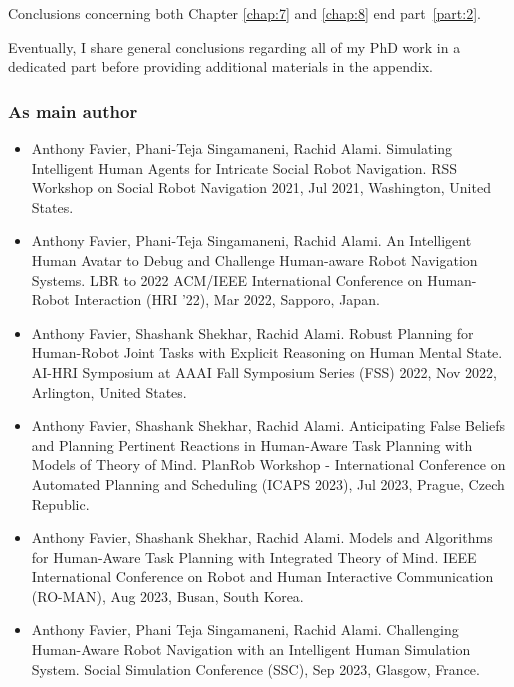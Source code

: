 Conclusions concerning both Chapter \ref{chap:7} and \ref{chap:8} end part~\ref{part:2}.

Eventually, I share general conclusions regarding all of my PhD work in a dedicated part before providing additional materials in the appendix.  


\subsubsection*{As main author}
\begin{itemize}

    \item Anthony Favier, Phani-Teja Singamaneni, Rachid Alami. Simulating Intelligent Human Agents for Intricate Social Robot Navigation. RSS Workshop on Social Robot Navigation 2021, Jul 2021, Washington, United States. 
    \item Anthony Favier, Phani-Teja Singamaneni, Rachid Alami. An Intelligent Human Avatar to Debug and Challenge Human-aware Robot Navigation Systems. LBR to 2022 ACM/IEEE International Conference on Human-Robot Interaction (HRI '22), Mar 2022, Sapporo, Japan. 
    \item Anthony Favier, Shashank Shekhar, Rachid Alami. Robust Planning for Human-Robot Joint Tasks with Explicit Reasoning on Human Mental State. AI-HRI Symposium at AAAI Fall Symposium Series (FSS) 2022, Nov 2022, Arlington, United States. 
    \item Anthony Favier, Shashank Shekhar, Rachid Alami. Anticipating False Beliefs and Planning Pertinent Reactions in Human-Aware Task Planning with Models of Theory of Mind. PlanRob Workshop - International Conference on Automated Planning and Scheduling (ICAPS 2023), Jul 2023, Prague, Czech Republic. 
    \item Anthony Favier, Shashank Shekhar, Rachid Alami. Models and Algorithms for Human-Aware Task Planning with Integrated Theory of Mind. IEEE International Conference on Robot and Human Interactive Communication (RO-MAN), Aug 2023, Busan, South Korea. 
    \item Anthony Favier, Phani Teja Singamaneni, Rachid Alami. Challenging Human-Aware Robot Navigation with an Intelligent Human Simulation System. Social Simulation Conference (SSC), Sep 2023, Glasgow, France. 
    
\end{itemize}
    
